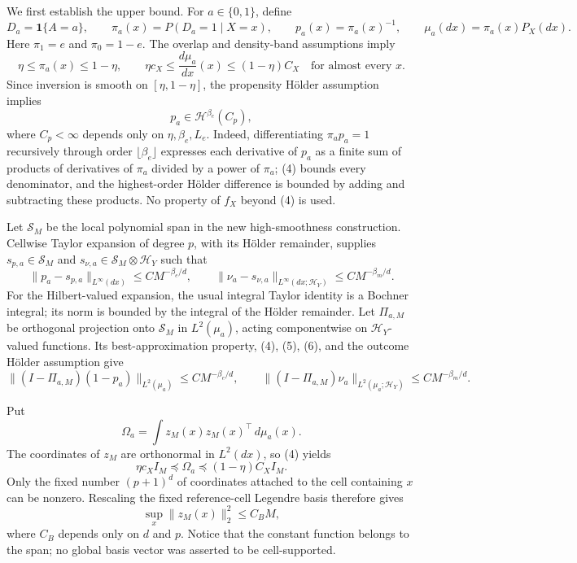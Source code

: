 We first establish the upper bound.  For \(a\in\{0,1\}\), define
\[
 D_a=\mathbf 1\{A=a\},
 \qquad
 \pi_a(x)=P(D_a=1\mid X=x),
 \qquad
 p_a(x)=\pi_a(x)^{-1},
 \qquad
 \mu_a(dx)=\pi_a(x)P_X(dx).
 \tag{3}
\]
Here \(\pi_1=e\) and \(\pi_0=1-e\).  The overlap and density-band assumptions imply
\[
 \eta\leq\pi_a(x)\leq1-\eta,
 \qquad
 \eta c_X\leq\frac{d\mu_a}{dx}(x)\leq(1-\eta)C_X
 \quad\text{for almost every }x.
 \tag{4}
\]
Since inversion is smooth on \([\eta,1-\eta]\), the propensity Hölder assumption implies
\[
 p_a\in\mathcal H^{\beta_e}(C_p),
 \tag{5}
\]
where \(C_p<\infty\) depends only on \(\eta,\beta_e,L_e\).  Indeed, differentiating \(\pi_ap_a=1\) recursively through order \(\lfloor\beta_e\rfloor\) expresses each derivative of \(p_a\) as a finite sum of products of derivatives of \(\pi_a\) divided by a power of \(\pi_a\); (4) bounds every denominator, and the highest-order Hölder difference is bounded by adding and subtracting these products.  No property of \(f_X\) beyond (4) is used.

Let \(\mathcal S_M\) be the local polynomial span in the new high-smoothness construction.  Cellwise Taylor expansion of degree \(p\), with its Hölder remainder, supplies \(s_{p,a}\in\mathcal S_M\) and \(s_{\nu,a}\in\mathcal S_M\otimes\mathcal H_Y\) such that
\[
 \|p_a-s_{p,a}\|_{L^\infty(dx)}
 \leq C M^{-\beta_e/d},
 \qquad
 \|\nu_a-s_{\nu,a}\|_{L^\infty(dx;\mathcal H_Y)}
 \leq C M^{-\beta_m/d}.
 \tag{6}
\]
For the Hilbert-valued expansion, the usual integral Taylor identity is a Bochner integral; its norm is bounded by the integral of the Hölder remainder.  Let \(\Pi_{a,M}\) be orthogonal projection onto \(\mathcal S_M\) in \(L^2(\mu_a)\), acting componentwise on \(\mathcal H_Y\)-valued functions.  Its best-approximation property, (4), (5), (6), and the outcome Hölder assumption give
\[
 \|(I-\Pi_{a,M})(1-p_a)\|_{L^2(\mu_a)}
 \leq C M^{-\beta_e/d},
 \qquad
 \|(I-\Pi_{a,M})\nu_a\|_{L^2(\mu_a;\mathcal H_Y)}
 \leq C M^{-\beta_m/d}.
 \tag{7}
\]

Put
\[
 \Omega_a=\int z_M(x)z_M(x)^\top\,d\mu_a(x).
 \tag{8}
\]
The coordinates of \(z_M\) are orthonormal in \(L^2(dx)\), so (4) yields
\[
 \eta c_X I_M\preceq\Omega_a
 \preceq(1-\eta)C_XI_M.
 \tag{9}
\]
Only the fixed number \((p+1)^d\) of coordinates attached to the cell containing \(x\) can be nonzero.  Rescaling the fixed reference-cell Legendre basis therefore gives
\[
 \sup_x\|z_M(x)\|_2^2\leq C_BM,
 \tag{10}
\]
where \(C_B\) depends only on \(d\) and \(p\).  Notice that the constant function belongs to the span; no global basis vector was asserted to be cell-supported.

